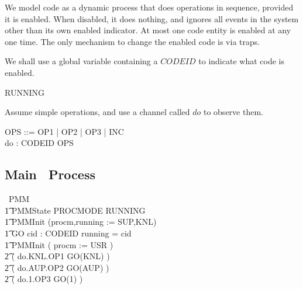 We model code as a dynamic process that does operations in sequence,
provided it is enabled.
When disabled, it does nothing, and ignores all events in the system
other than its own enabled indicator.
At most one code entity is enabled at any one time.
The only mechanism to change the enabled code is via
traps.

We shall use a global variable containing a $CODEID$ to indicate
what code is enabled.
\begin{circus}
RUNNING 
\end{circus}

Assume simple operations,
and use a channel called $do$ to observe them.
\begin{circus}
   OPS ::= OP1 | OP2 | OP3 | INC
\\ \circchannel do : CODEID \cross OPS
\end{circus}



\newpage
\subsection{Main \Circus\ Process}

\begin{circus}
\circprocess\ PMM \circdef \circbegin \\
\t1 \circstate PMMState  PROCMODE \land RUNNING \\
\t1 PMMInit \circdef (procm,running := SUP,KNL) \\
\t1 GO \circdef
   \circval cid : CODEID \circspot
      \lcircguard running = cid \rcircguard \circguard \Skip \\
\t1 \circspot PMMInit \circseq
               ( procm := USR ) \\
\t2 \circseq ( do.KNL.OP1 \then GO(KNL) ) \\
\t2 \circseq ( do.AUP.OP2 \then GO(AUP) ) \\
\t2 \circseq ( do.1.OP3 \then GO(1) )\\
\circend
\end{circus}
\
